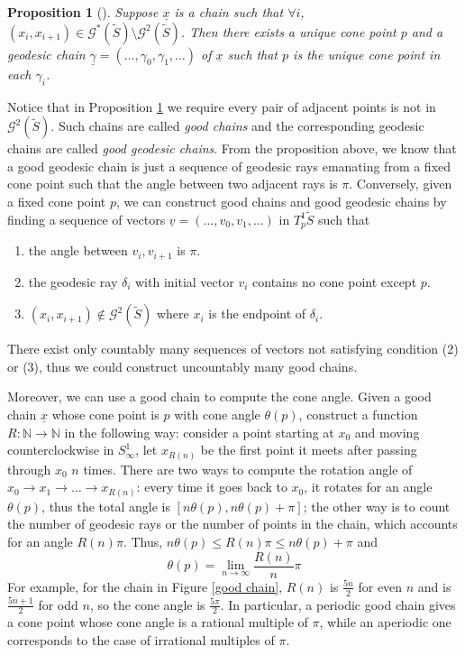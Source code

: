 \documentclass[reqno]{amsart}
\theoremstyle{plain}
\newtheorem{prop}[thm]{Proposition}
\theoremstyle{definition}
\theoremstyle{remark}
\theoremstyle{definition}
\newcommand{\N}{\mathbb N}
\newcommand{\?}{\textcolor{red}{?}}
\newcommand{\Gss}{\mathcal{G}^*(\tilde{S}) }
\newcommand{\Gts}{\mathcal{G}^2(\tilde{S}) }
\begin{document}
\begin{prop}[\cite{bankovic2018marked}]
\label{good chain prop}
Suppose $\underline{x}$ is a chain such that $\forall i$, $(x_i,x_{i+1})\in \Gss\setminus \Gts$. Then there exists a unique cone point $p$ and a geodesic chain $\underline{\gamma}=(\ldots,\gamma_0,\gamma_1,\ldots)$ of $\underline{x}$ such that $p$ is the unique cone point in each $\gamma_i$. 
\end{prop}

Notice that in Proposition \ref{good chain prop} we require every pair of adjacent points is not in $\Gts$. Such chains are called \textit{good chains} and the corresponding geodesic chains are called \textit{good geodesic chains}. From the proposition above, we know that a good geodesic chain is just a sequence of geodesic rays emanating from a fixed cone point such that the angle between two adjacent rays is $\pi$. Conversely, given a fixed cone point $p$, we can construct good chains and good geodesic chains by finding a sequence of vectors $\underline{v}=(\ldots,v_0,v_1,\ldots)$ in $T_p^1\tilde{S}$ such that
\begin{enumerate}
    \item[(1)] the angle between $v_i,v_{i+1}$ is $\pi$.
    \item[(2)] the geodesic ray $\delta_i$ with initial vector $v_i$ contains no cone point except $p$.
    \item[(3)] $(x_i,x_{i+1})\notin\Gts $ where $x_i$ is the endpoint of $\delta_i$.
\end{enumerate}
There exist only countably many sequences of vectors not satisfying condition (2) or (3), thus we could construct uncountably many good chains.

Moreover, we can use a good chain to compute the cone angle. Given a good chain $\underline{x}$ whose cone point is $p$ with cone angle $\theta(p)$, construct a function $R:\N\to \N$ in the following way: consider a point starting at $x_0$ and moving counterclockwise in $S^1_{\infty}$, let $x_{R(n)}$ be the first point it meets after passing through $x_0 $ $n$ times. There are two ways to compute the rotation angle of $x_0\to x_1 \to \ldots \to x_{R(n)}$: every time it goes back to $x_0$, it rotates for an angle $\theta(p)$, thus the total angle is $[n\theta(p),n\theta(p)+\pi]$; the other way is to count the number of geodesic rays or the number of points in the chain, which accounts for an angle $R(n)\pi$. Thus, $n\theta(p)\le R(n)\pi\le n\theta(p)+\pi$
and $$\theta(p) = \lim_{n\to\infty} \frac{R(n)}{n}\pi$$
For example, for the chain in Figure \ref{good chain}, $R(n)$ is $\frac{5n}{2}$ for even $n$ and is $\frac{5n+1}{2}$ for odd $n$, so the cone angle is $\frac{5\pi}{2}$. In particular, a periodic good chain gives a cone point whose cone angle is a rational multiple of $\pi$, while an aperiodic one corresponds to the case of irrational multiples of $\pi$. 
\end{document}
